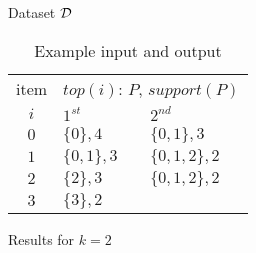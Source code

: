 \begin{table}
	\begin{subtable}[b]{0.48\textwidth}
		\centering
		
		\caption{\label{tab:toppi:sample:in}Dataset $\cal D$}
	\end{subtable}
	\hfill
	\begin{subtable}[b]{0.48\textwidth}
		\centering
		\begin{tabular}{|c|l|l|}
			\hline
			item   & \multicolumn{2}{c|}{$\mathit{top}(i)$: $P$, $\mathit{support}(P)$} \\
			$i$& $1^{st}$ &$ 2^{nd}$\\
			\hline
			$0$ & $\{0\},4$ & $\{0,1\},3$ \\
			$1$ & $\{0,1\},3$ & $\{0,1,2\},2$ \\
			$2$ & $\{2\},3$ & $\{0,1,2\},2$ \\
			$3$ & $\{3\},2$ & \\\hline
		\end{tabular}
		\caption{\label{tab:toppi:sample:out}Results for $k=2$}
	\end{subtable}
	\caption{Example \toppi input and output}
\end{table}
